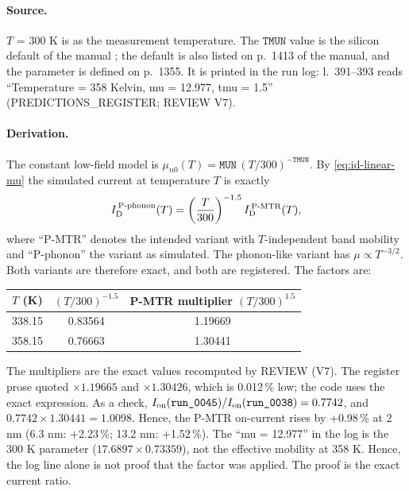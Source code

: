 \paragraph{Source.}
$T$ = 300 K is  as the measurement temperature. The $\texttt{TMUN}$ value is the silicon default of the manual \citep[p.~179, Table~3-43]{AtlasManual}; the default is also listed on p.~1413 of the manual, and the parameter is defined on p.~1355. It is printed in the  run log:  l.~391--393 reads ``Temperature = 358 Kelvin, mu = 12.977, tmu = 1.5'' (PREDICTIONS\_REGISTER; REVIEW V7).

\paragraph{Derivation.}
The constant low-field model \citep[p.~179, Eq.~3-215]{AtlasManual} is $\mu_{n0}(T)=\texttt{MUN}\,(T/300)^{-\texttt{TMUN}}$. By \cref{eq:id-linear-mu} the simulated current at temperature $T$ is exactly
\begin{equation}
  I_{\mathrm{D}}^{\,\text{P-phonon}}(T) = \left(\frac{T}{300}\right)^{-1.5}I_{\mathrm{D}}^{\,\text{P-MTR}}(T),
  \label{eq:d2-tmu-variants}
\end{equation}
where ``P-MTR'' denotes the intended variant with $T$-independent band mobility and ``P-phonon'' the variant as simulated. The phonon-like variant has $\mu\propto T^{-3/2}$. Both variants are therefore exact, and both are registered. The factors are:
\begin{center}
\small
\begin{tabular}{@{}lcc@{}}
\toprule
$T$ (K) & $(T/300)^{-1.5}$ & P-MTR multiplier $(T/300)^{1.5}$ \\
\midrule
338.15 & 0.83564 & 1.19669 \\
358.15 & 0.76663 & 1.30441 \\
\bottomrule
\end{tabular}
\end{center}
The multipliers are the exact values recomputed by REVIEW (V7). The register prose quoted $\times1.19665$ and $\times1.30426$, which is 0.012\,\% low; the code uses the exact expression. As a check, $I_{\mathrm{on}}(\texttt{run\_0045})/I_{\mathrm{on}}(\texttt{run\_0038})=0.7742$, and $0.7742\times1.30441=1.0098$. Hence, the P-MTR on-current rises by +0.98\,\% at 2 nm (6.3 nm: +2.23\,\%; 13.2 nm: +1.52\,\%). The ``mu = 12.977'' in the log is the 300 K parameter ($17.6897\times0.73359$), not the effective mobility at 358 K. Hence, the log line alone is not proof that the factor was applied. The proof is the exact current ratio.

